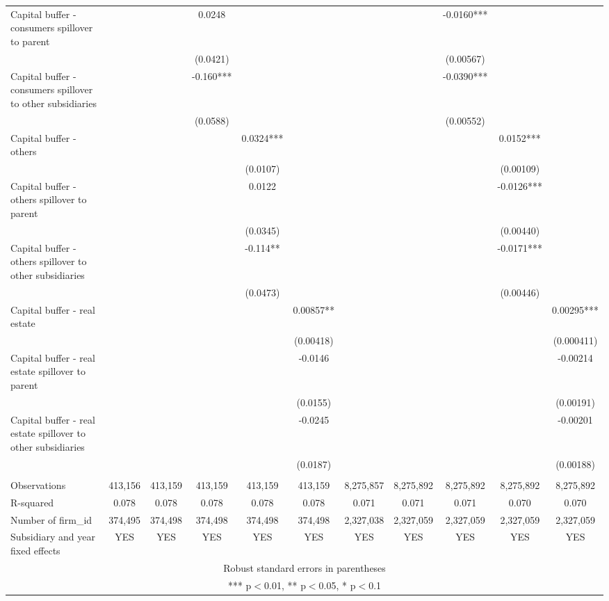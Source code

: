 \begin{tabular}{lcccccccccc}
Capital buffer - consumers spillover to parent &  &  & 0.0248 &  &  &  &  & -0.0160*** &  &  \\
 &  &  & (0.0421) &  &  &  &  & (0.00567) &  &  \\
Capital buffer - consumers spillover to other subsidiaries &  &  & -0.160*** &  &  &  &  & -0.0390*** &  &  \\
 &  &  & (0.0588) &  &  &  &  & (0.00552) &  &  \\
Capital buffer - others &  &  &  & 0.0324*** &  &  &  &  & 0.0152*** &  \\
 &  &  &  & (0.0107) &  &  &  &  & (0.00109) &  \\
Capital buffer - others spillover to parent &  &  &  & 0.0122 &  &  &  &  & -0.0126*** &  \\
 &  &  &  & (0.0345) &  &  &  &  & (0.00440) &  \\
Capital buffer - others spillover to other subsidiaries &  &  &  & -0.114** &  &  &  &  & -0.0171*** &  \\
 &  &  &  & (0.0473) &  &  &  &  & (0.00446) &  \\
Capital buffer - real estate &  &  &  &  & 0.00857** &  &  &  &  & 0.00295*** \\
 &  &  &  &  & (0.00418) &  &  &  &  & (0.000411) \\
Capital buffer - real estate spillover to parent &  &  &  &  & -0.0146 &  &  &  &  & -0.00214 \\
 &  &  &  &  & (0.0155) &  &  &  &  & (0.00191) \\
Capital buffer - real estate spillover to other subsidiaries &  &  &  &  & -0.0245 &  &  &  &  & -0.00201 \\
 &  &  &  &  & (0.0187) &  &  &  &  & (0.00188) \\
 &  &  &  &  &  &  &  &  &  &  \\
Observations & 413,156 & 413,159 & 413,159 & 413,159 & 413,159 & 8,275,857 & 8,275,892 & 8,275,892 & 8,275,892 & 8,275,892 \\
R-squared & 0.078 & 0.078 & 0.078 & 0.078 & 0.078 & 0.071 & 0.071 & 0.071 & 0.070 & 0.070 \\
Number of firm\_id & 374,495 & 374,498 & 374,498 & 374,498 & 374,498 & 2,327,038 & 2,327,059 & 2,327,059 & 2,327,059 & 2,327,059 \\
 Subsidiary and year fixed effects & YES & YES & YES & YES & YES & YES & YES & YES & YES & YES \\ \hline
\multicolumn{11}{c}{ Robust standard errors in parentheses} \\
\multicolumn{11}{c}{ *** p$<$0.01, ** p$<$0.05, * p$<$0.1} \\
\end{tabular}
